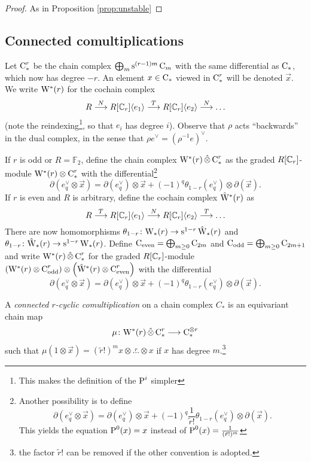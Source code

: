 \begin{proof}
	As in Proposition \ref{prop:unstable}
\end{proof}

\subsection{Connected comultiplications}

Let $\operatorname{C}_*^r$ be the chain complex $\bigoplus_m \operatorname{s}^{(r-1)m}\operatorname{C}_m$ with the same differential as $\operatorname{C}_*$, which now has degree $-r$. An element $x\in \operatorname{C}_*$ viewed in $\operatorname{C}_*^r$ will be denoted $\vec{x}$. We write $\mathrm{W}^*(r)$ for the cochain complex
\[
R\overset{N}{\longrightarrow} R[\mathbb{C}_r]\langle e_1\rangle \overset{T}{\longrightarrow} R[\mathbb{C}_r]\langle e_2\rangle \overset{N}{\longrightarrow} \ldots
\]
(note the reindexing\footnote{This makes the definition of the $\operatorname{P}^i$ simpler}, so that $e_i$ has degree $i$). Observe that $\rho$ acts ``backwards'' in the dual complex, in the sense that $\rho e^\vee = (\rho^{-1} e)^{\vee}$.


If $r$ is odd or $R=\mathbb{F}_2$, define the chain complex $\mathrm{W}^*(r)\operatorname{\hat{\otimes}} \operatorname{C}_*^r$ as the graded $R[\mathbb{C}_r]$-module $\mathrm{W}^*(r)\otimes \operatorname{C}_*^r$ with the differential\footnote{Another possibility is to define
	\[
	\partial(e^\vee_q\otimes \vec{x}) = \partial (e^\vee_q)\otimes \vec{x} + (-1)^q \frac{1}{\tilde{r}!}\theta_{1-r}(e^\vee_q)\otimes \partial (\vec{x}).
	\]
	This yields the equation $\operatorname{P}^0(x) = x$ instead of $\operatorname{P}^0(x) = \frac{1}{(\tilde{r}!)^m}$
}
\[
\partial(e^\vee_q\otimes \vec{x}) = \partial (e^\vee_q)\otimes \vec{x} + (-1)^q \theta_{1-r}(e^\vee_q)\otimes \partial (\vec{x}).
\]
If $r$ is even and $R$ is arbitrary, define the cochain complex $\hat{\mathrm{W}}^*(r)$ as
\[
R\overset{T}{\longrightarrow} R[\mathbb{C}_r]\langle e_1\rangle \overset{N}{\longrightarrow} R[\mathbb{C}_r]\langle e_2\rangle \overset{T}{\longrightarrow}\ldots
\]
There are now homomorphisms $\theta_{1-r}\colon \mathrm{W}_*(r)\to \operatorname{s}^{1-r}\hat{\mathrm{W}}_*(r)$ and $\theta_{1-r}\colon \hat{\mathrm{W}}_*(r)\to \operatorname{s}^{1-r}\mathrm{W}_*(r)$. Define $\operatorname{C}_{\mathrm{even}} = \bigoplus_{m\geq 0}\operatorname{C}_{2m}$ and $\operatorname{C}_{\mathrm{odd}} = \bigoplus_{m\geq 0}\operatorname{C}_{2m+1}$ and write $\mathrm{W}^*(r)\operatorname{\hat{\otimes}} \operatorname{C}_*^r$ for the graded $R[\mathbb{C}_r]$-module $\left(\mathrm{W}^*(r)\otimes \operatorname{C}_{\mathrm{odd}}^r\right)\otimes \left(\hat{\mathrm{W}}^*(r)\otimes \operatorname{C}_{\mathrm{even}}^r\right)$ with the differential
\[
\partial(e^\vee_q\otimes \vec{x}) = \partial (e^\vee_q)\otimes \vec{x} + (-1)^q \theta_{1-r}(e^\vee_q)\otimes \partial (\vec{x}).
\]
\begin{definition}
	A \emph{connected $r$-cyclic comultiplication} on a chain complex $C_*$ is an equivariant chain map
	\[
	\mu\colon \mathrm{W}^*(r)\operatorname{\hat{\otimes}} \operatorname{C}^r_*\longrightarrow \operatorname{C}_*^{\otimes r}
	\]
	such that $\mu(1 \otimes \vec{x}) = (\tilde{r}!)^{m}x\otimes\overset{r}{\ldots}\otimes x$ if $x$ has degree $m$.\footnote{the factor $\tilde{r}!$ can be removed if the other convention is adopted.}
\end{definition}

